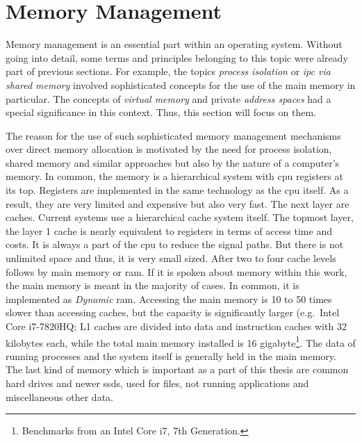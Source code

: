 \section{Memory Management}\label{sec:memory-management}
Memory management is an essential part within an operating system.
Without going into detail, some terms and principles belonging to this topic were already part of previous sections.
For example, the topics \textit{process isolation} or \textit{\ac{ipc} via shared memory} involved sophisticated concepts for the use of the main memory in particular.
The concepts of \textit{virtual memory} and private \textit{address spaces} had a special significance in this context.
Thus, this section will focus on them.

The reason for the use of such sophisticated memory management mechanisms over direct memory allocation is motivated by the need for process isolation, shared memory and similar approaches but also by the nature of a computer's memory.
In common, the memory is a hierarchical system with \ac{cpu} registers at its top.
Registers are implemented in the same technology as the \ac{cpu} itself. 
As a result, they are very limited and expensive but also very fast.
The next layer are caches.
Current systems use a hierarchical cache system itself.
The topmost layer, the layer 1 cache is nearly equivalent to registers in terms of access time and costs\cite{tanenbaum-modern-operating-systems}.
It is always a part of the \ac{cpu} to reduce the signal paths.
But there is not unlimited space and thus, it is very small sized\cite{tanenbaum-modern-operating-systems}.
After two to four cache levels follows by main memory or \ac{ram}.
If it is spoken about memory within this work, the main memory is meant in the majority of cases.
In common, it is implemented as \textit{Dynamic} \ac{ram}.
Accessing the main memory is 10 to 50 times slower than accessing caches, but the capacity is significantly larger (e.g.\ Intel Core i7-7820HQ; L1 caches are divided into data and instruction caches with 32 kilobytes each, while the total main memory installed is 16 gigabyte\footnote{Benchmarks from an Intel Core i7, 7th Generation.}\cite{mandl2014Grundkurs}.
The data of running processes and the system itself is generally held in the main memory.
The last kind of memory which is important as a part of this thesis are common hard drives and newer \acp{ssd}, used for files, not running applications and miscellaneous other data.

